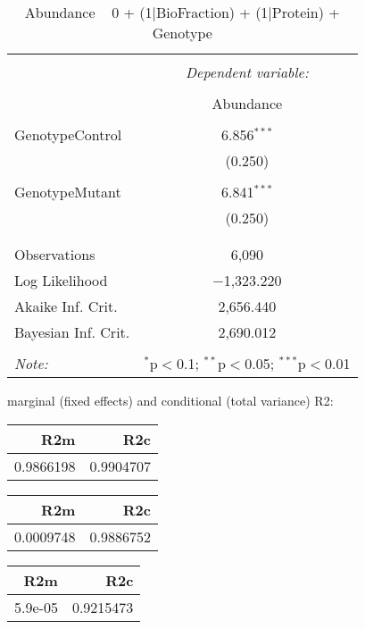 \documentclass[11pt]{report}
\begin{document}
\begin{table}[!htbp] \centering 
  \caption{Abundance ~ 0 + (1|BioFraction) + (1|Protein) + Genotype} 
  \label{} 
\begin{tabular}{@{\extracolsep{5pt}}lc} 
\\[-1.8ex]\hline 
\hline \\[-1.8ex] 
 & \multicolumn{1}{c}{\textit{Dependent variable:}} \\ 
\cline{2-2} 
\\[-1.8ex] & Abundance \\ 
\hline \\[-1.8ex] 
 GenotypeControl & 6.856$^{***}$ \\ 
  & (0.250) \\ 
  & \\ 
 GenotypeMutant & 6.841$^{***}$ \\ 
  & (0.250) \\ 
  & \\ 
\hline \\[-1.8ex] 
Observations & 6,090 \\ 
Log Likelihood & $-$1,323.220 \\ 
Akaike Inf. Crit. & 2,656.440 \\ 
Bayesian Inf. Crit. & 2,690.012 \\ 
\hline 
\hline \\[-1.8ex] 
\textit{Note:}  & \multicolumn{1}{r}{$^{*}$p$<$0.1; $^{**}$p$<$0.05; $^{***}$p$<$0.01} \\ 
\end{tabular} 
\end{table} 
marginal (fixed effects) and conditional (total variance) R2:

\begin{tabular}{r|r}
\hline
R2m & R2c\\
\hline
0.9866198 & 0.9904707\\
\hline
\end{tabular}

\begin{tabular}{r|r}
\hline
R2m & R2c\\
\hline
0.0009748 & 0.9886752\\
\hline
\end{tabular}

\begin{tabular}{r|r}
\hline
R2m & R2c\\
\hline
5.9e-05 & 0.9215473\\
\hline
\end{tabular}
\end{document}
